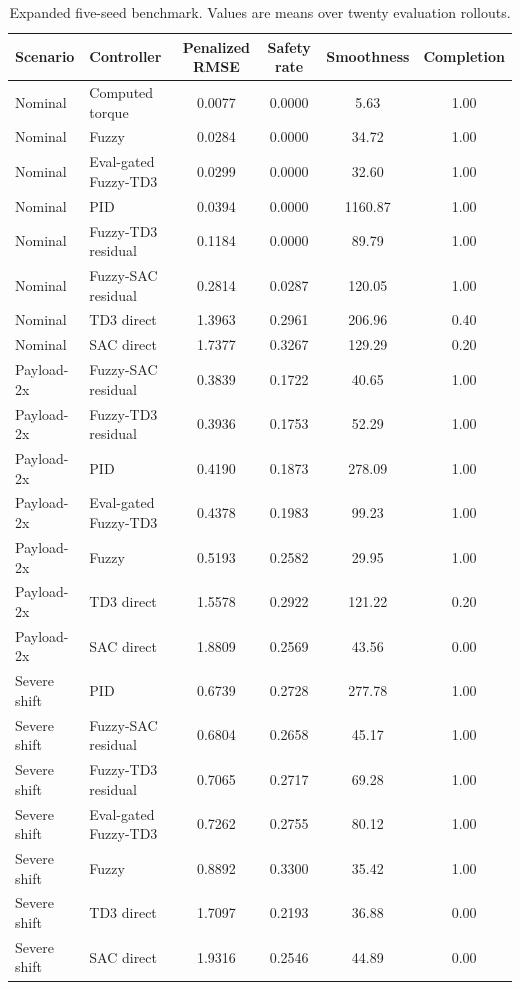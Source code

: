 \documentclass[reprint,amsmath,amssymb,aps,pra]{revtex4-2}
\begin{document}
\begin{table}[t]
\caption{Expanded five-seed benchmark. Values are means over twenty evaluation rollouts.}
\scriptsize
\begin{ruledtabular}
\begin{tabular}{l l c c c c}
Scenario & Controller & Penalized RMSE & Safety rate & Smoothness & Completion \\
\hline
Nominal & Computed torque & 0.0077 & 0.0000 & 5.63 & 1.00 \\
Nominal & Fuzzy & 0.0284 & 0.0000 & 34.72 & 1.00 \\
Nominal & Eval-gated Fuzzy-TD3 & 0.0299 & 0.0000 & 32.60 & 1.00 \\
Nominal & PID & 0.0394 & 0.0000 & 1160.87 & 1.00 \\
Nominal & Fuzzy-TD3 residual & 0.1184 & 0.0000 & 89.79 & 1.00 \\
Nominal & Fuzzy-SAC residual & 0.2814 & 0.0287 & 120.05 & 1.00 \\
Nominal & TD3 direct & 1.3963 & 0.2961 & 206.96 & 0.40 \\
Nominal & SAC direct & 1.7377 & 0.3267 & 129.29 & 0.20 \\
Payload-2x & Fuzzy-SAC residual & 0.3839 & 0.1722 & 40.65 & 1.00 \\
Payload-2x & Fuzzy-TD3 residual & 0.3936 & 0.1753 & 52.29 & 1.00 \\
Payload-2x & PID & 0.4190 & 0.1873 & 278.09 & 1.00 \\
Payload-2x & Eval-gated Fuzzy-TD3 & 0.4378 & 0.1983 & 99.23 & 1.00 \\
Payload-2x & Fuzzy & 0.5193 & 0.2582 & 29.95 & 1.00 \\
Payload-2x & TD3 direct & 1.5578 & 0.2922 & 121.22 & 0.20 \\
Payload-2x & SAC direct & 1.8809 & 0.2569 & 43.56 & 0.00 \\
Severe shift & PID & 0.6739 & 0.2728 & 277.78 & 1.00 \\
Severe shift & Fuzzy-SAC residual & 0.6804 & 0.2658 & 45.17 & 1.00 \\
Severe shift & Fuzzy-TD3 residual & 0.7065 & 0.2717 & 69.28 & 1.00 \\
Severe shift & Eval-gated Fuzzy-TD3 & 0.7262 & 0.2755 & 80.12 & 1.00 \\
Severe shift & Fuzzy & 0.8892 & 0.3300 & 35.42 & 1.00 \\
Severe shift & TD3 direct & 1.7097 & 0.2193 & 36.88 & 0.00 \\
Severe shift & SAC direct & 1.9316 & 0.2546 & 44.89 & 0.00 \\
\end{tabular}
\end{ruledtabular}
\label{tab:main_results}
\end{table}
\end{document}
